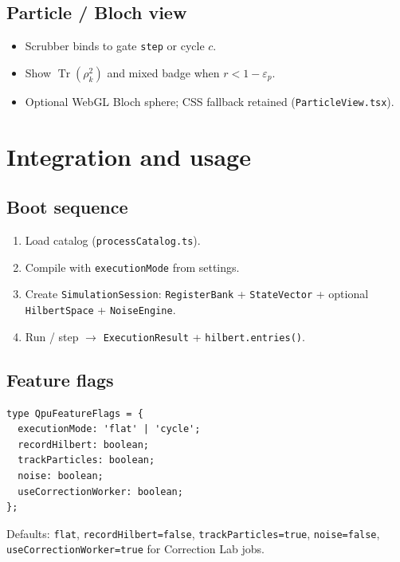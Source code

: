 \documentclass[11pt,a4paper]{article}
\newcommand{\Tr}{\operatorname{Tr}}
\begin{document}
\subsection{Particle / Bloch view}

\begin{itemize}
  \item Scrubber binds to gate \texttt{step} or cycle $c$.
  \item Show $\Tr(\rho_k^2)$ and mixed badge when $r<1-\varepsilon_p$.
  \item Optional WebGL Bloch sphere; CSS fallback retained (\texttt{ParticleView.tsx}).
\end{itemize}

\section{Integration and usage}

\subsection{Boot sequence}

\begin{enumerate}
  \item Load catalog (\texttt{processCatalog.ts}).
  \item Compile with \texttt{executionMode} from settings.
  \item Create \texttt{SimulationSession}: \texttt{RegisterBank} + \texttt{StateVector} + optional \texttt{HilbertSpace} + \texttt{NoiseEngine}.
  \item Run / step $\rightarrow$ \texttt{ExecutionResult} + \texttt{hilbert.entries()}.
\end{enumerate}

\subsection{Feature flags}

\begin{lstlisting}[style=protocol]
type QpuFeatureFlags = {
  executionMode: 'flat' | 'cycle';
  recordHilbert: boolean;
  trackParticles: boolean;
  noise: boolean;
  useCorrectionWorker: boolean;
};
\end{lstlisting}

Defaults: \texttt{flat}, \texttt{recordHilbert=false}, \texttt{trackParticles=true}, \texttt{noise=false}, \texttt{useCorrectionWorker=true} for Correction Lab jobs.
\end{document}
